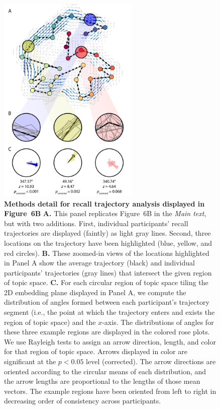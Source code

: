 \documentclass{article}
\newcommand{\trajectories}{6}
\begin{document}
\renewcommand{\figurename}{Supplementary Figure}
\setcounter{figure}{3}
\setcounter{page}{1}
\makeatletter

\begin{figure}[tp]
\centering
\includegraphics[width=0.6\textwidth]{figs/topic_space_flow}
\caption{\small \textbf{Methods detail for recall trajectory analysis displayed in Figure~\trajectories B} \textbf{A.} This panel replicates Figure~\trajectories B in the \textit{Main text}, but with two additions.  First, individual participants' recall trajectories are displayed (faintly) as light gray lines.  Second, three locations on the trajectory have been highlighted (blue, yellow, and red circles).  \textbf{B.}  These zoomed-in views of the locations highlighted in Panel A show the average trajectory (black) and individual participants' trajectories (gray lines) that intersect the given region of topic space.  \textbf{C.} For each circular region of topic space tiling the 2D embedding plane displayed in Panel A, we compute the distribution of angles formed between each participant's trajectory segment (i.e., the point at which the trajectory enters and exists the region of topic space) and the $x$-axis.  The distributions of angles for these three example regions are displayed in the colored rose plots.  We use Rayleigh tests to assign an arrow direction, length, and color for that region of topic space.  Arrows displayed in color are significant at the $p < 0.05$ level (corrected).  The arrow directions are oriented according to the circular means of each distribution, and the arrow lengths are proportional to the lengths of those mean vectors.  The example regions have been oriented from left to right in decreasing order of consistency across participants.}
\label{fig:arrows-methods}
\end{figure}
\FloatBarrier
\end{document}
